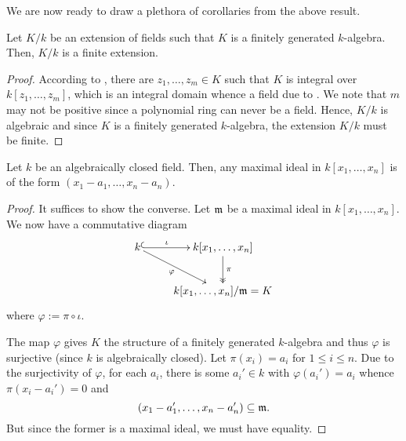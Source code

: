 We are now ready to draw a plethora of corollaries from the above result.

\begin{lemma}
    Let $K/k$ be an extension of fields such that $K$ is a finitely generated $k$-algebra. Then, $K/k$ is a finite extension.
\end{lemma}
\begin{proof}
    According to , there are $z_1,\dots,z_m\in K$ such that $K$ is integral over $k[z_1,\dots,z_m]$, which is an integral domain whence a field due to . We note that $m$ may not be positive since a polynomial ring can never be a field. Hence, $K/k$ is algebraic and since $K$ is a finitely generated $k$-algebra, the extension $K/k$ must be finite.
\end{proof}

\begin{theorem}
    Let $k$ be an algebraically closed field. Then, any maximal ideal in $k[x_1,\dots,x_n]$ is of the form $(x_1 - a_1,\dots,x_n - a_n)$.
\end{theorem}
\begin{proof}
    It suffices to show the converse. Let $\mathfrak m$ be a maximal ideal in $k[x_1,\dots,x_n]$. We now have a commutative diagram 
    \begin{equation*}
        \xymatrix {
            k\ar@{^(->}[r]^-{\iota}\ar[rd]_-{\varphi} & k[x_1,\dots,x_n]\ar@{->>}[d]^-{\pi}\\
            & k[x_1,\dots,x_n]/\frakm = K
        }
    \end{equation*}
    where $\varphi := \pi\circ\iota$.

    The map $\varphi$ gives $K$ the structure of a finitely generated $k$-algebra and thus $\varphi$ is surjective (since $k$ is algebraically closed). Let $\pi(x_i) = a_i$ for $1\le i\le n$. Due to the surjectivity of $\varphi$, for each $a_i$, there is some $a_i'\in k$ with $\varphi(a_i') = a_i$ whence $\pi(x_i - a_i') = 0$ and 
    \begin{equation*}
        (x_1 - a_1',\dots,x_n - a_n')\subseteq\mathfrak m.
    \end{equation*}
    But since the former is a maximal ideal, we must have equality.
\end{proof}